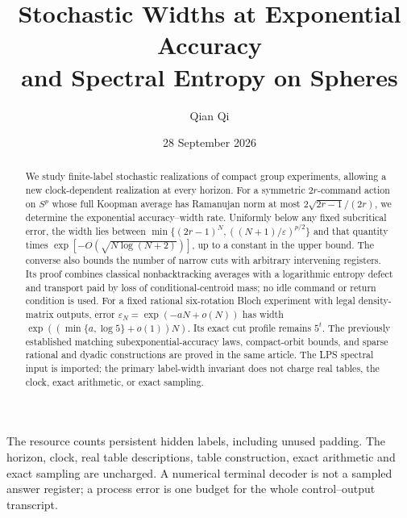 \documentclass[11pt]{amsart}
\title[Stochastic widths at exponential accuracy]{Stochastic Widths at Exponential Accuracy\\and Spectral Entropy on Spheres}
\author{Qian Qi}
\date{28 September 2026}
\numberwithin{equation}{section}
\theoremstyle{definition}\newtheorem{definition}[theorem]{Definition}
\theoremstyle{remark}\newtheorem{remark}[theorem]{Remark}
\begin{document}
\begin{abstract}
We study finite-label stochastic realizations of compact group experiments,
allowing a new clock-dependent realization at every horizon. For a
symmetric $2r$-command action on $S^p$ whose full Koopman average has
Ramanujan norm at most $2\sqrt{2r-1}/(2r)$, we determine the exponential
accuracy--width rate. Uniformly below any fixed subcritical error,
the width lies between $\min\{(2r-1)^N,((N+1)/\varepsilon)^{p/2}\}$
and that quantity times $\exp[-O(\sqrt{N\log(N+2)})]$, up to a constant
in the upper bound. The converse also bounds the number of narrow cuts
with arbitrary intervening registers. Its proof combines classical
nonbacktracking averages with a logarithmic entropy defect and transport
paid by loss of conditional-centroid mass; no idle command or return
condition is used. For a fixed rational six-rotation Bloch experiment
with legal density-matrix outputs, error $\varepsilon_N=\exp(-aN+o(N))$
has width $\exp((\min\{a,\log5\}+o(1))N)$. Its exact cut profile remains
$5^t$. The previously established matching subexponential-accuracy laws,
compact-orbit bounds, and sparse rational and dyadic constructions are
proved in the same article. The LPS spectral input is imported; the
primary label-width invariant does not charge real tables, the clock,
exact arithmetic, or exact sampling.
\end{abstract}
\maketitle
\noindent The resource counts persistent hidden labels, including unused
padding. The horizon, clock, real table descriptions, table construction,
exact arithmetic and exact sampling are uncharged. A numerical terminal
decoder is not a sampled answer register; a process error is one budget
for the whole control--output transcript.



















\end{document}
